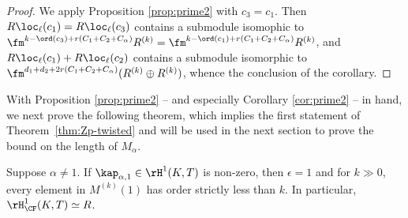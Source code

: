 \begin{proof} We apply Proposition \ref{prop:prime2}
with $c_3 = c_1$. Then $R\loc_\ell(c_1) = R\loc_\ell(c_3)$ contains a submodule isomophic
to $\fm^{k-\ord(c_3)+r(C_1+C_2+C_\alpha)}R^{(k)} = \fm^{k-\ord(c_1)+r(C_1+C_2+C_\alpha)}R^{(k)}$, and
$R\loc_\ell(c_1) + R\loc_\ell(c_2)$ contains a submodule isomorphic to
$\fm^{d_1+d_2+2r(C_1+C_2+C_\alpha)}(R^{(k)}\oplus R^{(k)})$,
whence the conclusion of the corollary.
\end{proof}


With Proposition \ref{prop:prime2} -- and especially Corollary \ref{cor:prime2} -- in hand, we next prove the following theorem, which implies the first statement of Theorem~\ref{thm:Zp-twisted} and will be used in the next section to prove the bound on
the length of $M_\alpha$.

\begin{theorem}
\notready\label{thm:rank1}
Suppose $\alpha\neq 1$.
If $\kap_{\alpha,1}\in \rH^1(K,T)$ is non-zero, then $\epsilon=1$ and for $k\gg 0$, every element in $M^{(k)}(1)$ has order strictly less than $k$. In particular, $\rH^1_{\CF}(K,T)\simeq R$.
\end{theorem}

